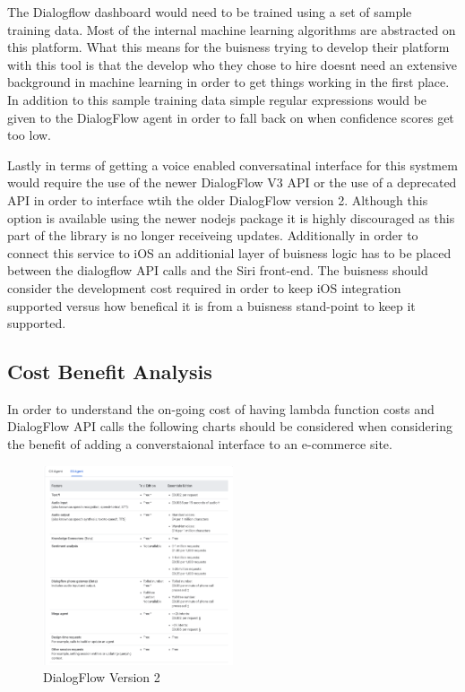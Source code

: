 \documentclass[9pt,software]{livecoms}
\begin{document}
The Dialogflow dashboard would need to be trained using a set of sample training data. Most of the internal machine learning algorithms are abstracted on this platform. 
What this means for the buisness trying to develop their platform with this tool is that the develop who they chose to hire doesnt need an extensive background in machine
learning in order to get things working in the first place. In addition to this sample training data simple regular expressions would be given to the DialogFlow agent in order
to fall back on when confidence scores get too low. 

Lastly in terms of getting a voice enabled conversatinal interface for this systmem would require the use of the newer DialogFlow V3 API or the use of a deprecated 
API in order to interface wtih the older DialogFlow version 2. Although this option is available using the newer nodejs package it is highly discouraged as this part
of the library is no longer receiveing updates. Additionally in order to connect this service to iOS an additionial layer of buisness logic has to be placed between the 
dialogflow API calls and the Siri front-end. The buisness should consider the development cost required in order to keep iOS integration supported versus how 
benefical it is from a buisness stand-point to keep it supported. 

\subsection{Cost Benefit Analysis}
In order to understand the on-going cost of having lambda function costs and DialogFlow API calls the following charts should be considered when 
considering the benefit of adding a converstaional interface to an e-commerce site. 

\begin{figure}
  \caption{DialogFlow Version 2}
  \centering
  \includegraphics[width=0.5\textwidth]{ESAgent.PNG}
\end{figure}
\end{document}
